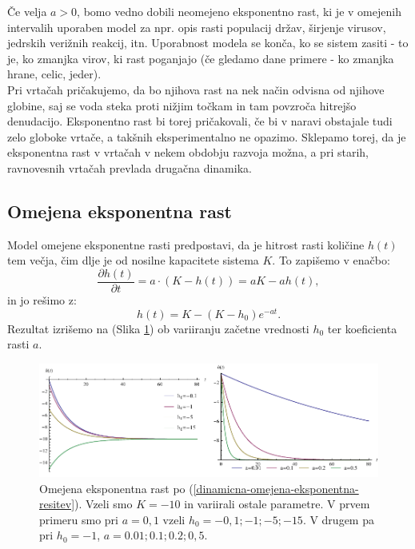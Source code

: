 \documentclass[a4paper, twoside, 12pt]{book}
\begin{document}
Če velja $a > 0$, bomo vedno dobili neomejeno eksponentno rast, ki je v omejenih intervalih uporaben model za npr. opis rasti populacij držav, širjenje virusov, jedrskih verižnih reakcij, itn. Uporabnost modela se konča, ko se sistem zasiti - to je, ko zmanjka virov, ki rast poganjajo (če gledamo dane primere - ko zmanjka hrane, celic, jeder).\\
Pri vrtačah pričakujemo, da bo njihova rast na nek način odvisna od njihove globine, saj se voda steka proti nižjim točkam in tam povzroča hitrejšo denudacijo. Eksponentno rast bi torej pričakovali, če bi v naravi obstajale tudi zelo globoke vrtače, a takšnih eksperimentalno ne opazimo. Sklepamo torej, da je eksponentna rast v vrtačah v nekem obdobju razvoja možna, a pri starih, ravnovesnih vrtačah prevlada drugačna dinamika.


\subsection{Omejena eksponentna rast}

Model omejene eksponentne rasti predpostavi, da je hitrost rasti količine $h(t)$ tem večja, čim dlje je od nosilne kapacitete sistema $K$. To zapišemo v enačbo:
    \begin{equation}
      \frac{\partial h(t)}{\partial t} = a \cdot ( K - h(t) ) = a K - a h(t),
      \label{dinamicna-omejena-eksponentna}
    \end{equation}
in jo rešimo z:
   \begin{equation}
      h(t) = K - (K - h_0) e^{-a t}.
      \label{dinamicna-omejena-eksponentna-resitev}
    \end{equation}
Rezultat izrišemo na (Slika \ref{fig:omejena-eksponentna-rast}) ob variiranju začetne vrednosti $h_0$ ter koeficienta rasti $a$.

    \begin{figure}[h]
      \begin{center}
        \includegraphics[width=14cm]{slike/omejena-eksponentna-rast}
      \end{center}
      \caption{Omejena eksponentna rast po (\ref{dinamicna-omejena-eksponentna-resitev}). Vzeli smo $K=-10$ in variirali ostale parametre. V prvem primeru smo pri $a=0,1$ vzeli $h_0=-0,1;-1;-5;-15$. V drugem pa pri $h_0=-1$, $a=0.01;0.1;0.2;0,5$.}
      \label{fig:omejena-eksponentna-rast}
    \end{figure}
\end{document}
